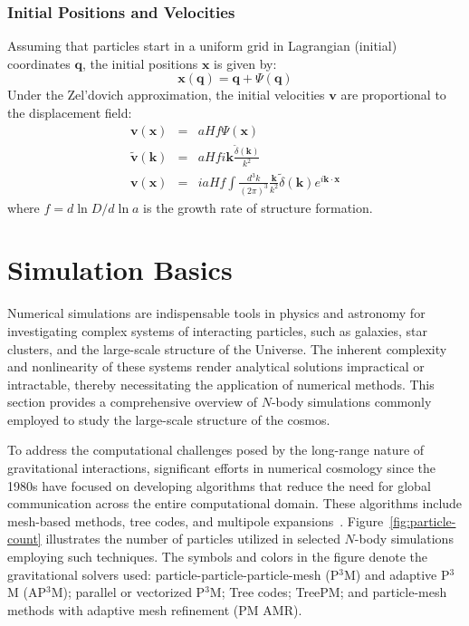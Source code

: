 \subsubsection{Initial Positions and Velocities}
Assuming that particles start in a uniform grid in Lagrangian (initial) coordinates $\mathbf{q}$, the initial positions $\mathbf{x}$ is given by:
\begin{equation}
    \mathbf{x}(\mathbf{q}) = \mathbf{q} + \Psi(\mathbf{q})
\end{equation}
Under the Zel'dovich approximation, the initial velocities $\mathbf{v}$ are proportional to the displacement field:
\begin{eqnarray}
    \mathbf{v}(\mathbf{x}) &=& a H f \Psi(\mathbf{x}) \nonumber \\
    \tilde{\mathbf{v}}(\mathbf{k}) &=& a H f i\mathbf{k} \frac{\tilde{\delta}(\mathbf{k})}{k^2} \nonumber \\
    \mathbf{v}(\mathbf{x}) &=& i a H f\int \frac{d^3k}{(2\pi)^3} \frac{\mathbf{k}}{k^2} \tilde{\delta}(\mathbf{k}) e^{i\mathbf{k} \cdot \mathbf{x}}
\end{eqnarray}
where $f = d\ln D/d\ln a$ is the growth rate of structure formation.

\section{Simulation Basics}
Numerical simulations are indispensable tools in physics and astronomy for investigating complex systems of interacting particles, such as galaxies, star clusters, and the large-scale structure of the Universe. The inherent complexity and nonlinearity of these systems render analytical solutions impractical or intractable, thereby necessitating the application of numerical methods. This section provides a comprehensive overview of $N$-body simulations commonly employed to study the large-scale structure of the cosmos.

To address the computational challenges posed by the long-range nature of gravitational interactions, significant efforts in numerical cosmology since the 1980s have focused on developing algorithms that reduce the need for global communication across the entire computational domain. These algorithms include mesh-based methods, tree codes, and multipole expansions~\citep{1981csup.book.....H}. Figure~\ref{fig:particle-count} illustrates the number of particles utilized in selected $N$-body simulations employing such techniques. The symbols and colors in the figure denote the gravitational solvers used: particle-particle-particle-mesh (P$^3$M) and adaptive P$^3$M (AP$^3$M); parallel or vectorized P$^3$M; Tree codes; TreePM; and particle-mesh methods with adaptive mesh refinement (PM AMR).

